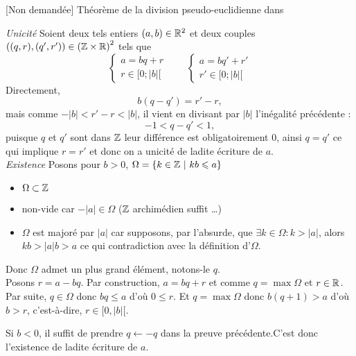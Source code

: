 \documentclass{article}
\begin{document}
\begin{question_kholle}
	[\begin{equation}
			\forall (a, b) \in \R \times \R^*,
			\exists ! (q, r) \in \Z \times \R :
			\left\{ \begin{matrix}
				a = b q + r \\
				r \in [0;|b|[
			\end{matrix} \right.
		\end{equation}]
	{[Non demandée] Théorème de la division pseudo-euclidienne dans \R}

	\textit{Unicité} \;
	Soient deux tels entiers $(a,b) \in \mathbb R^2$ et deux couples $((q,r),(q',r')) \in \left(\mathbb Z \times \mathbb R\right)^2$ tels que
	\begin{equation*}
		\left\{ \begin{matrix}
			a = b q + r \\
			r \in [0;|b|[
		\end{matrix} \right.
		\qquad
		\left\{ \begin{matrix}
			a = b q' + r' \\
			r' \in [0;|b|[
		\end{matrix} \right.
	\end{equation*}
	Directement,
	\[
		b(q-q') = r'-r,
	\]
	mais comme $-|b| < r' - r < |b|$, il vient en divisant par $|b|$ l'inégalité précédente :
	\[
		-1 < q - q' < 1,
	\]
	puisque $q$ et $q'$ sont dans $\mathbb Z$ leur différence est obligatoirement $0$, ainsi $q = q'$ ce qui implique $ r= r'$ et donc on a unicité de ladite écriture de $a$.
	\newline
	\\
	\textit{Existence} \; Posons pour $b > 0$, $\Omega = \{ k\in \mathbb Z  \ | \ kb \leqslant a \}$
	\begin{itemize}
		\item $\Omega \subset \mathbb Z$
		\item non-vide car $-|a| \in \Omega$ ($\mathbb Z$ archimédien suffit \ldots)
		\item $\Omega$ est majoré par $|a|$ car supposons, par l'absurde, que $\exists k \in \Omega : k > |a|$, alors $kb > |a|b > a$ ce qui contradiction avec la définition d'$\Omega$.
	\end{itemize}
	Donc $\Omega$ admet un plus grand élément, notons-le $q$. \\
	Posons $r = a - bq$. Par construction, $a = bq + r$ et comme $q = \max \Omega$ et $r \in \mathbb R$.
	\\
	Par suite, $q \in \Omega$ donc $bq \leqslant a$ d'où $0 \leqslant r$. Et $q = \max \Omega$ donc $b(q+1) > a$ d'où $b > r$, c'est-à-dire, $r \in [ 0, |b| [$.

	Si $b < 0$, il suffit de prendre $q \leftarrow -q$ dans la preuve précédente.C'est donc l'existence de ladite écriture de $a$.
\end{question_kholle}
\end{document}

